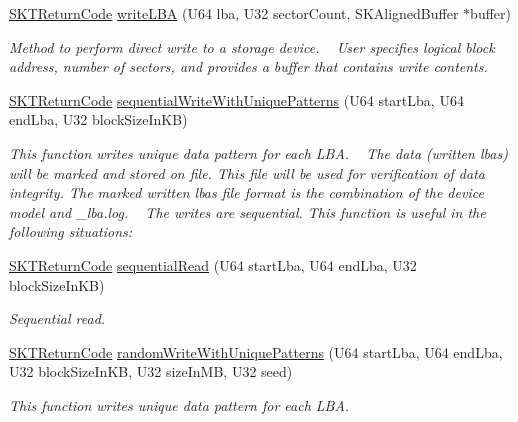 \begin{DoxyCompactItemize}
\mbox{\hyperlink{_storage_kit_test_delegate_8h_a143844aea21c1ac420c1d0307a69deb7}{S\+K\+T\+Return\+Code}} \mbox{\hyperlink{class_s_k_t_test_delegate_a5f419fc0e074bf3faccf3163b1c55831}{write\+L\+BA}} (U64 lba, U32 sector\+Count, S\+K\+Aligned\+Buffer $\ast$buffer)
\begin{DoxyCompactList}\small\item\em Method to perform direct write to a storage device. ~\newline
User specifies logical block address, number of sectors, and provides a buffer that contains write contents. \end{DoxyCompactList}\item 
\mbox{\hyperlink{_storage_kit_test_delegate_8h_a143844aea21c1ac420c1d0307a69deb7}{S\+K\+T\+Return\+Code}} \mbox{\hyperlink{class_s_k_t_test_delegate_a0c1650ce1ef4c16593d4a950dc78dedf}{sequential\+Write\+With\+Unique\+Patterns}} (U64 start\+Lba, U64 end\+Lba, U32 block\+Size\+In\+KB)
\begin{DoxyCompactList}\small\item\em This function writes unique data pattern for each L\+BA. ~\newline
The data (written lbas) will be marked and stored on file. This file will be used for verification of data integrity. The marked written lbas file format is the combination of the device model and \textquotesingle{}\+\_\+lba.\+log\textquotesingle{}. ~\newline
The writes are sequential. This function is useful in the following situations\+: \end{DoxyCompactList}\item 
\mbox{\hyperlink{_storage_kit_test_delegate_8h_a143844aea21c1ac420c1d0307a69deb7}{S\+K\+T\+Return\+Code}} \mbox{\hyperlink{class_s_k_t_test_delegate_a5a6f15d6814f37378ba7a3b898cf41fe}{sequential\+Read}} (U64 start\+Lba, U64 end\+Lba, U32 block\+Size\+In\+KB)
\begin{DoxyCompactList}\small\item\em Sequential read. \end{DoxyCompactList}\item 
\mbox{\hyperlink{_storage_kit_test_delegate_8h_a143844aea21c1ac420c1d0307a69deb7}{S\+K\+T\+Return\+Code}} \mbox{\hyperlink{class_s_k_t_test_delegate_a5a1208defc74b67bdb4b1c486dea6087}{random\+Write\+With\+Unique\+Patterns}} (U64 start\+Lba, U64 end\+Lba, U32 block\+Size\+In\+KB, U32 size\+In\+MB, U32 seed)
\begin{DoxyCompactList}\small\item\em This function writes unique data pattern for each L\+BA. ~\newline

\end{DoxyCompactList}
\end{DoxyCompactItemize}
